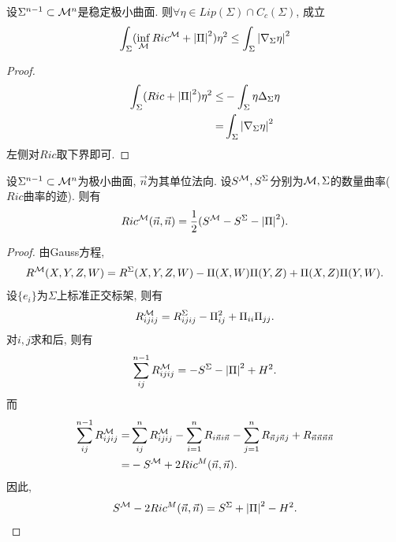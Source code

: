 \begin{proposition}
    设$\Sigma^{n-1} \subset {\mathcal{M}}^n$是稳定极小曲面. 则$\forall \eta \in Lip(\Sigma) \cap C_c(\Sigma)$, 成立
    \begin{equation}
        \int_{\Sigma}(\inf_{{\mathcal{M}}}Ric^{\mathcal{M}}+\left | {\Pi} \right |^2)\eta^2 \le \int_\Sigma \left | \nabla_\Sigma \eta \right |^2
    \end{equation}
\end{proposition}
\begin{proof}
    \begin{equation}
        \begin{split}
            \int_\Sigma (Ric+\left | {\Pi} \right |^2)\eta^2 \le& - \int_\Sigma \eta \Delta_\Sigma \eta \\
            =& \int_\Sigma \left | \nabla_\Sigma \eta \right |^2
        \end{split}
    \end{equation}
    左侧对$Ric$取下界即可.
\end{proof}
\begin{lemma} \label{scalar_curvature}
    设$\Sigma^{n-1}\subset {\mathcal{M}}^n$为极小曲面, $\vec{n}$为其单位法向. 设$S^{\mathcal{M}},S^\Sigma$分别为${\mathcal{M}}, \Sigma$的数量曲率($Ric$曲率的迹). 则有
    \begin{equation} \label{ric_scalar}
        Ric^{\mathcal{M}}(\vec{n},\vec{n}) = \frac{1}{2}(S^{\mathcal{M}}-S^\Sigma - \left | {\Pi} \right |^2).
    \end{equation}
\end{lemma}
\begin{proof}
    由Gauss方程,
    \begin{equation}
        R^{\mathcal{M}}(X,Y,Z,W)=R^\Sigma(X,Y,Z,W)-{\Pi}(X,W){\Pi}(Y,Z)+{\Pi}(X,Z){\Pi}(Y,W).
    \end{equation}
    设$\{e_i\}$为$\Sigma$上标准正交标架, 则有
    \begin{equation}
        R^{\mathcal{M}}_{ijij}=R^\Sigma_{ijij}-{\Pi}_{ij}^2+{\Pi}_{ii}{\Pi}_{jj}.
    \end{equation}
    对$i,j$求和后, 则有
    \begin{equation}
        \sum_{ij}^{n-1}R^{\mathcal{M}}_{ijij} = -S^\Sigma  -\left | {\Pi} \right |^2 + H^2.
    \end{equation}
    而 
    \begin{equation}
        \begin{split}
            \sum_{ij}^{n-1}R^{\mathcal{M}}_{ijij} = & \sum_{ij}^{n}R^{\mathcal{M}}_{ijij}-\sum_{i=1}^nR_{i\vec{n}i\vec{n}}-\sum_{j=1}^nR_{\vec{n}j\vec{n}j}+R_{\vec{n}\vec{n}\vec{n}\vec{n}}\\
            =& -S^{\mathcal{M}}+2Ric^M(\vec{n},\vec{n}).
        \end{split}
    \end{equation}
    因此, 
    \begin{equation}
        S^{\mathcal{M}}-2Ric^M(\vec{n},\vec{n})=S^\Sigma+\left | {\Pi} \right |^2-H^2.
    \end{equation}
\end{proof}
